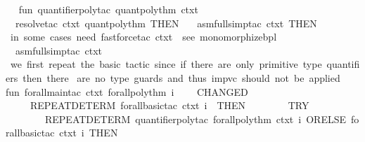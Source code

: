 \begin{isabellebody}
\ \ {\isacharbrackright}{\kern0pt}{\isacharsemicolon}{\kern0pt}\isanewline
\isanewline
fun\ quantifier{\isacharunderscore}{\kern0pt}poly{\isacharunderscore}{\kern0pt}tac\ quant{\isacharunderscore}{\kern0pt}poly{\isacharunderscore}{\kern0pt}thm\ ctxt\ {\isacharequal}{\kern0pt}\isanewline
\ \ resolve{\isacharunderscore}{\kern0pt}tac\ ctxt\ {\isacharbrackleft}{\kern0pt}quant{\isacharunderscore}{\kern0pt}poly{\isacharunderscore}{\kern0pt}thm{\isacharbrackright}{\kern0pt}\ THEN{\isacharprime}{\kern0pt}\ \isanewline
\ \ asm{\isacharunderscore}{\kern0pt}full{\isacharunderscore}{\kern0pt}simp{\isacharunderscore}{\kern0pt}tac\ ctxt\ THEN{\isacharprime}{\kern0pt}\isanewline
{\isacharparenleft}{\kern0pt}{\isacharasterisk}{\kern0pt}\ in\ some\ cases\ need\ fastforce{\isacharunderscore}{\kern0pt}tac\ ctxt\ {\isacharbrackleft}{\kern0pt}{\isacharbrackright}{\kern0pt}{\isacharsemicolon}{\kern0pt}{\isacharcomma}{\kern0pt}\ see\ monomorphize{}{\isachardot}{\kern0pt}bpl\ {\isacharasterisk}{\kern0pt}{\isacharparenright}{\kern0pt}\isanewline
\ \ asm{\isacharunderscore}{\kern0pt}full{\isacharunderscore}{\kern0pt}simp{\isacharunderscore}{\kern0pt}tac\ ctxt\isanewline
\ \ \isanewline
\isanewline
{\isacharparenleft}{\kern0pt}{\isacharasterisk}{\kern0pt}\ we\ first\ repeat\ the\ basic\ tactic{\isacharcomma}{\kern0pt}\ since\ if\ there\ are\ only\ primitive\ type\ quantifiers{\isacharcomma}{\kern0pt}\ then\ there\ \isanewline
are\ no\ type\ guards\ {\isacharparenleft}{\kern0pt}and\ thus{\isacharcomma}{\kern0pt}\ imp{\isacharunderscore}{\kern0pt}vc\ should\ not\ be\ applied{\isacharparenright}{\kern0pt}\ {\isacharasterisk}{\kern0pt}{\isacharparenright}{\kern0pt}\isanewline
fun\ forall{\isacharunderscore}{\kern0pt}main{\isacharunderscore}{\kern0pt}tac\ ctxt\ forall{\isacharunderscore}{\kern0pt}poly{\isacharunderscore}{\kern0pt}thm\ i\ {\isacharequal}{\kern0pt}\ \isanewline
\ \ CHANGED\isanewline
\ \ \ \ {\isacharparenleft}{\kern0pt}\ {\isacharparenleft}{\kern0pt}REPEAT{\isacharunderscore}{\kern0pt}DETERM\ {\isacharparenleft}{\kern0pt}forall{\isacharunderscore}{\kern0pt}basic{\isacharunderscore}{\kern0pt}tac\ ctxt\ i{\isacharparenright}{\kern0pt}{\isacharparenright}{\kern0pt}\ \ THEN\ {\isacharparenleft}{\kern0pt}\isanewline
\ \ \ \ \ \ \ TRY\isanewline
\ \ \ \ \ \ \ \ {\isacharparenleft}{\kern0pt}REPEAT{\isacharunderscore}{\kern0pt}DETERM{}\ {\isacharparenleft}{\kern0pt}{\isacharparenleft}{\kern0pt}quantifier{\isacharunderscore}{\kern0pt}poly{\isacharunderscore}{\kern0pt}tac\ forall{\isacharunderscore}{\kern0pt}poly{\isacharunderscore}{\kern0pt}thm\ ctxt\ i{\isacharparenright}{\kern0pt}\ ORELSE\ {\isacharparenleft}{\kern0pt}forall{\isacharunderscore}{\kern0pt}basic{\isacharunderscore}{\kern0pt}tac\ ctxt\ i{\isacharparenright}{\kern0pt}{\isacharparenright}{\kern0pt}\ THEN\isanewline

\end{isabellebody}

